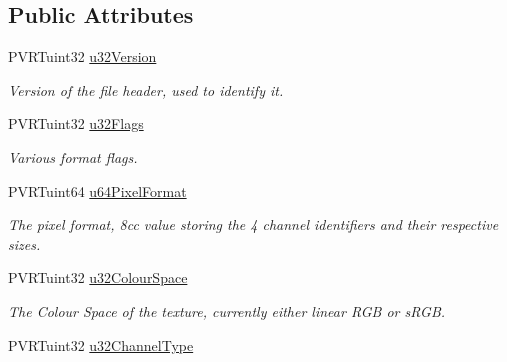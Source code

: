\subsection*{Public Attributes}
\begin{DoxyCompactItemize}
\item 
\hypertarget{struct_p_v_r_texture_header_v3_a5816642f28d7312574736e75cb39359d}{P\+V\+R\+Tuint32 \hyperlink{struct_p_v_r_texture_header_v3_a5816642f28d7312574736e75cb39359d}{u32\+Version}}\label{struct_p_v_r_texture_header_v3_a5816642f28d7312574736e75cb39359d}

\begin{DoxyCompactList}\small\item\em Version of the file header, used to identify it. \end{DoxyCompactList}\item 
\hypertarget{struct_p_v_r_texture_header_v3_a55a3ec93cfb9d2f12fcf6073d7772d5f}{P\+V\+R\+Tuint32 \hyperlink{struct_p_v_r_texture_header_v3_a55a3ec93cfb9d2f12fcf6073d7772d5f}{u32\+Flags}}\label{struct_p_v_r_texture_header_v3_a55a3ec93cfb9d2f12fcf6073d7772d5f}

\begin{DoxyCompactList}\small\item\em Various format flags. \end{DoxyCompactList}\item 
\hypertarget{struct_p_v_r_texture_header_v3_a9fa7db60ade1348ddf311c3d5c5610a4}{P\+V\+R\+Tuint64 \hyperlink{struct_p_v_r_texture_header_v3_a9fa7db60ade1348ddf311c3d5c5610a4}{u64\+Pixel\+Format}}\label{struct_p_v_r_texture_header_v3_a9fa7db60ade1348ddf311c3d5c5610a4}

\begin{DoxyCompactList}\small\item\em The pixel format, 8cc value storing the 4 channel identifiers and their respective sizes. \end{DoxyCompactList}\item 
\hypertarget{struct_p_v_r_texture_header_v3_aa20faf11c37c3dd60cc1ff3f11d2bf8f}{P\+V\+R\+Tuint32 \hyperlink{struct_p_v_r_texture_header_v3_aa20faf11c37c3dd60cc1ff3f11d2bf8f}{u32\+Colour\+Space}}\label{struct_p_v_r_texture_header_v3_aa20faf11c37c3dd60cc1ff3f11d2bf8f}

\begin{DoxyCompactList}\small\item\em The Colour Space of the texture, currently either linear R\+G\+B or s\+R\+G\+B. \end{DoxyCompactList}\item 
\hypertarget{struct_p_v_r_texture_header_v3_ae7a61a91b7e08446e506b7e511e44695}{P\+V\+R\+Tuint32 \hyperlink{struct_p_v_r_texture_header_v3_ae7a61a91b7e08446e506b7e511e44695}{u32\+Channel\+Type}}\label{struct_p_v_r_texture_header_v3_ae7a61a91b7e08446e506b7e511e44695}


\end{DoxyCompactItemize}
